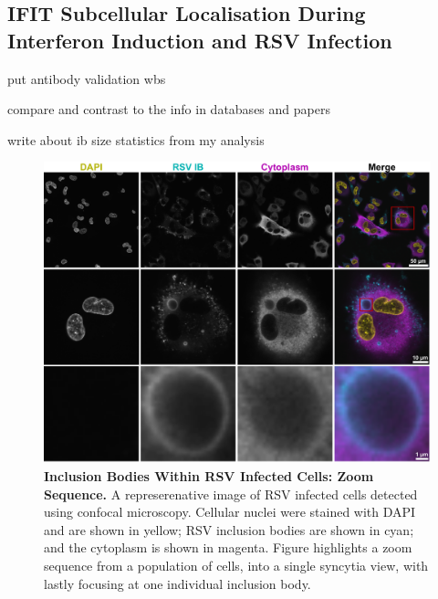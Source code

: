 \subsection{IFIT Subcellular Localisation During Interferon Induction and RSV Infection} \label{subsec:IFIT Subcellular Localisation During Interferon INduction and RSV Infection}
put antibody validation wbs

compare and contrast to the info in databases and papers

write about ib size statistics from my analysis

\begin{figure}
    \centering
    \includegraphics[width=1\linewidth]{09. Chapter 4/Figs/01. Localisation introduction/01. IB-zooms.pdf}
    \caption[Inclusion Bodies Within RSV Infected Cells: Zoom Sequence.]{\textbf{Inclusion Bodies Within RSV Infected Cells: Zoom Sequence.} A represerenative image of RSV infected cells detected using confocal microscopy. Cellular nuclei were stained with DAPI and are shown in yellow; RSV inclusion bodies are shown in cyan; and the cytoplasm is shown in magenta. Figure highlights a zoom sequence from a population of cells, into a single syncytia view, with lastly focusing at one individual inclusion body.}
    \label{fig:Inclusion Bodies Within RSV Infected Cells: Zoom Sequence}
\end{figure}


